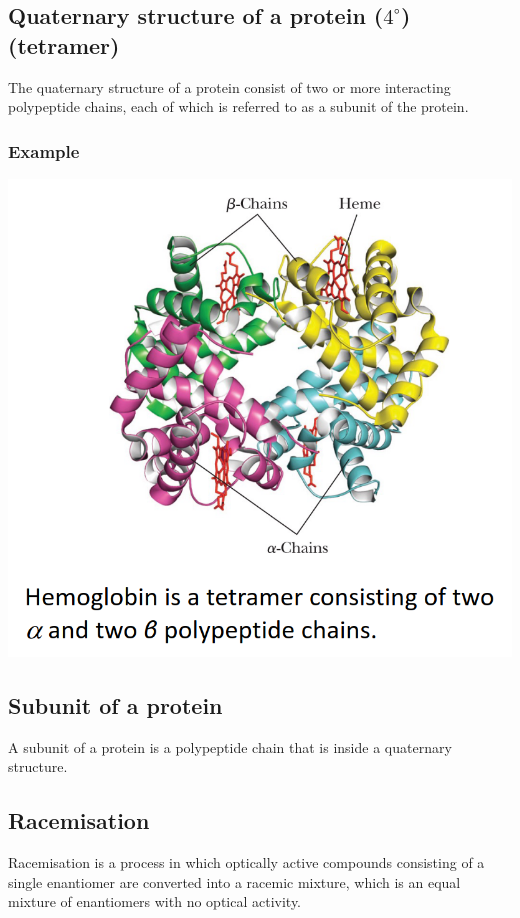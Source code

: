 \documentclass[11pt]{article}
\begin{document}
\subsection{Quaternary structure of a protein (\(4^{\circ}\)) (tetramer)}
\label{sec:org05a166e}
The quaternary structure of a protein consist of two or more interacting polypeptide chains, each of which is referred to as a subunit of the protein.

\subsubsection{Example}
\label{sec:orgafd9dc2}
\begin{center}
\includegraphics[width=.9\linewidth]{./images/hemoglobin.png}
\end{center}

\subsection{Subunit of a protein}
\label{sec:org78a336e}
A subunit of a protein is a polypeptide chain that is inside a quaternary structure.

\subsection{Racemisation}
\label{sec:org3784212}
Racemisation is a process in which optically active compounds consisting of a single enantiomer are converted into a racemic mixture, which is an equal mixture of enantiomers with no optical activity.
\end{document}
